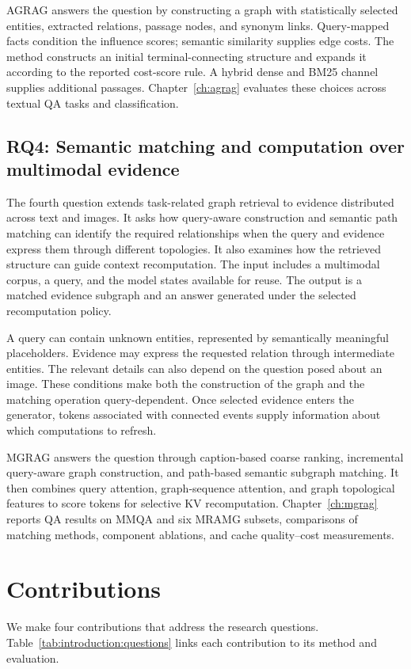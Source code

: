 AGRAG answers the question by constructing a graph with statistically selected entities, extracted relations, passage nodes, and synonym links. Query-mapped facts condition the influence scores; semantic similarity supplies edge costs. The method constructs an initial terminal-connecting structure and expands it according to the reported cost-score rule. A hybrid dense and BM25 channel supplies additional passages. Chapter~\ref{ch:agrag} evaluates these choices across textual QA tasks and classification.

\subsection{RQ4: Semantic matching and computation over multimodal evidence}
The fourth question extends task-related graph retrieval to evidence distributed across text and images. It asks how query-aware construction and semantic path matching can identify the required relationships when the query and evidence express them through different topologies. It also examines how the retrieved structure can guide context recomputation. The input includes a multimodal corpus, a query, and the model states available for reuse. The output is a matched evidence subgraph and an answer generated under the selected recomputation policy.

A query can contain unknown entities, represented by semantically meaningful placeholders. Evidence may express the requested relation through intermediate entities. The relevant details can also depend on the question posed about an image. These conditions make both the construction of the graph and the matching operation query-dependent. Once selected evidence enters the generator, tokens associated with connected events supply information about which computations to refresh.

MGRAG answers the question through caption-based coarse ranking, incremental query-aware graph construction, and path-based semantic subgraph matching. It then combines query attention, graph-sequence attention, and graph topological features to score tokens for selective KV recomputation. Chapter~\ref{ch:mgrag} reports QA results on MMQA and six MRAMG subsets, comparisons of matching methods, component ablations, and cache quality--cost measurements.

\section{Contributions}
\label{sec:introduction:contributions}
We make four contributions that address the research questions. Table~\ref{tab:introduction:questions} links each contribution to its method and evaluation.

